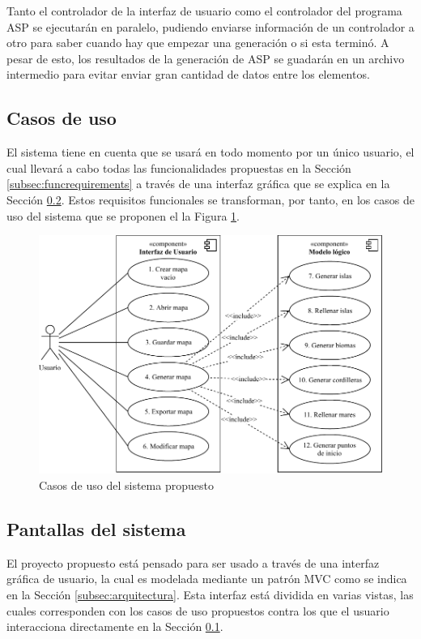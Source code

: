 Tanto el controlador de la interfaz de usuario como el controlador del programa ASP se ejecutarán en paralelo, pudiendo enviarse información de un controlador a otro para saber cuando hay que empezar una generación o si esta terminó. A pesar de esto, los resultados de la generación de ASP se guadarán en un archivo intermedio para evitar enviar gran cantidad de datos entre los elementos.

\subsection{Casos de uso}
\label{subsec:cases}

El sistema tiene en cuenta que se usará en todo momento por un único usuario, el cual llevará a cabo todas las funcionalidades propuestas en la Sección \ref{subsec:funcrequirements} a través de una interfaz gráfica que se explica en la Sección \ref{subsec:mockups}. Estos requisitos funcionales se transforman, por tanto, en los casos de uso del sistema que se proponen el la Figura \ref{fig:cases}.

\begin{figure}[!h]
	\centering
	\includegraphics[width=\textwidth]{images/casos-de-uso.pdf}
	\caption{Casos de uso del sistema propuesto}
	\label{fig:cases}
\end{figure}

\subsection{Pantallas del sistema}
\label{subsec:mockups}

El proyecto propuesto está pensado para ser usado a través de una interfaz gráfica de usuario, la cual es modelada mediante un patrón MVC como se indica en la Sección \ref{subsec:arquitectura}. Esta interfaz está dividida en varias vistas, las cuales corresponden con los casos de uso propuestos contra los que el usuario interacciona directamente en la Sección \ref{subsec:cases}.

